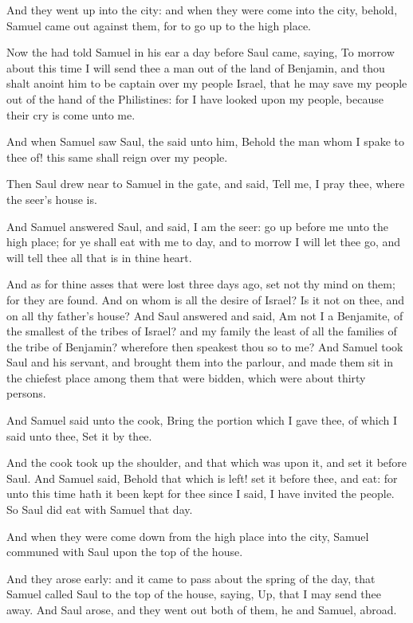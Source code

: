 \Verse And they went up into the city: and when they were come into the city, behold, Samuel came out against them, for to go up to the high place.

\Verse Now the \LORD had told Samuel in his ear a day before Saul came, saying, \Verse To morrow about this time I will send thee a man out of the land of Benjamin, and thou shalt anoint him to be captain over my people Israel, that he may save my people out of the hand of the Philistines: for I have looked upon my people, because their cry is come unto me.

\Verse And when Samuel saw Saul, the \LORD said unto him, Behold the man whom I spake to thee of! this same shall reign over my people.

\Verse Then Saul drew near to Samuel in the gate, and said, Tell me, I pray thee, where the seer's house is.

\Verse And Samuel answered Saul, and said, I am the seer: go up before me unto the high place; for ye shall eat with me to day, and to morrow I will let thee go, and will tell thee all that is in thine heart.

\Verse And as for thine asses that were lost three days ago, set not thy mind on them; for they are found. And on whom is all the desire of Israel? Is it not on thee, and on all thy father's house?  \Verse And Saul answered and said, Am not I a Benjamite, of the smallest of the tribes of Israel? and my family the least of all the families of the tribe of Benjamin? wherefore then speakest thou so to me?  \Verse And Samuel took Saul and his servant, and brought them into the parlour, and made them sit in the chiefest place among them that were bidden, which were about thirty persons.

\Verse And Samuel said unto the cook, Bring the portion which I gave thee, of which I said unto thee, Set it by thee.

\Verse And the cook took up the shoulder, and that which was upon it, and set it before Saul. And Samuel said, Behold that which is left!  set it before thee, and eat: for unto this time hath it been kept for thee since I said, I have invited the people. So Saul did eat with Samuel that day.

\Verse And when they were come down from the high place into the city, Samuel communed with Saul upon the top of the house.

\Verse And they arose early: and it came to pass about the spring of the day, that Samuel called Saul to the top of the house, saying, Up, that I may send thee away. And Saul arose, and they went out both of them, he and Samuel, abroad.

